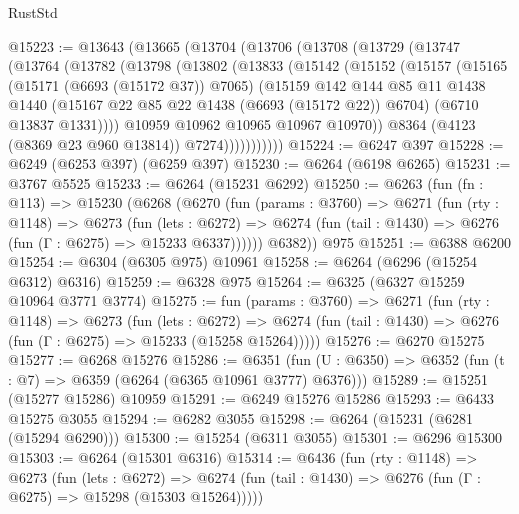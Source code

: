 \begin{lexlean}{RustStd}
\begin{coremodule}
@15223 := @13643
    (@13665
      (@13704
        (@13706
          (@13708
            (@13729
              (@13747
                (@13764
                  (@13782
                    (@13798
                      (@13802
                        (@13833
                          (@15142
                            (@15152
                              (@15157
                                (@15165
                                  (@15171 (@6693 (@15172 @37)) @7065)
                                  (@15159
                                    @142
                                    @144
                                    @85
                                    @11
                                    @1438
                                    @1440
                                    (@15167 @22 @85 @22 @1438 (@6693 (@15172 @22)) @6704)
                                    (@6710 @13837 @1331))))
                              @10959
                              @10962
                              @10965
                              @10967
                              @10970))
                          @8364
                          (@4123 (@8369 @23 @960 @13814))
                          @7274)))))))))))
@15224 := @6247 @397
@15228 := @6249 (@6253 @397) (@6259 @397)
@15230 := @6264 (@6198 @6265)
@15231 := @3767 @5525
@15233 := @6264 (@15231 @6292)
@15250 := @6263
    (fun (fn : @113) =>
    @15230
      (@6268
        (@6270
          (fun (params : @3760) =>
          @6271
            (fun (rty : @1148) =>
            @6273
              (fun (lets : @6272) =>
              @6274 (fun (tail : @1430) => @6276 (fun (Γ : @6275) => @15233 @6337))))))
        @6382))
    @975
@15251 := @6388 @6200
@15254 := @6304 (@6305 @975) @10961
@15258 := @6264 (@6296 (@15254 @6312) @6316)
@15259 := @6328 @975
@15264 := @6325 (@6327 @15259 @10964 @3771 @3774)
@15275 := fun (params : @3760) =>
  @6271
    (fun (rty : @1148) =>
    @6273
      (fun (lets : @6272) =>
      @6274 (fun (tail : @1430) => @6276 (fun (Γ : @6275) => @15233 (@15258 @15264)))))
@15276 := @6270 @15275
@15277 := @6268 @15276
@15286 := @6351
    (fun (U : @6350) => @6352 (fun (t : @7) => @6359 (@6264 (@6365 @10961 @3777) @6376)))
@15289 := @15251 (@15277 @15286) @10959
@15291 := @6249 @15276 @15286
@15293 := @6433 @15275 @3055
@15294 := @6282 @3055
@15298 := @6264 (@15231 (@6281 (@15294 @6290)))
@15300 := @15254 (@6311 @3055)
@15301 := @6296 @15300
@15303 := @6264 (@15301 @6316)
@15314 := @6436
    (fun (rty : @1148) =>
    @6273
      (fun (lets : @6272) =>
      @6274 (fun (tail : @1430) => @6276 (fun (Γ : @6275) => @15298 (@15303 @15264)))))

\end{coremodule}
\end{lexlean}
